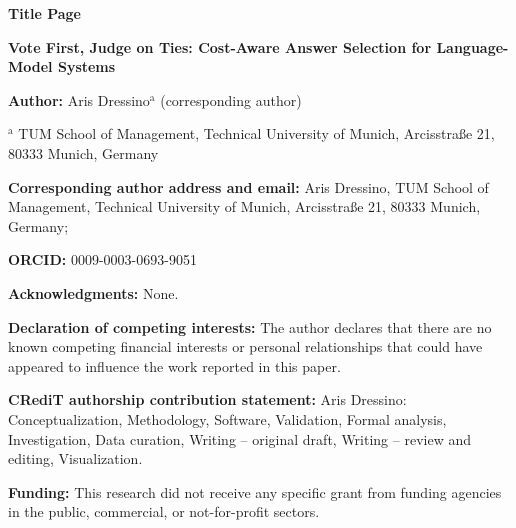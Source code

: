 \documentclass[11pt]{article}
\begin{document}
\begin{center}
{\Large\bfseries Title Page\par}
\vspace{1em}
{\large\bfseries Vote First, Judge on Ties: Cost-Aware Answer Selection for Language-Model Systems\par}
\end{center}

\textbf{Author:} Aris Dressino$^{\mathrm{a}}$ (corresponding author)

$^{\mathrm{a}}$ TUM School of Management, Technical University of Munich, Arcisstra{\ss}e 21, 80333 Munich, Germany

\textbf{Corresponding author address and email:} Aris Dressino, TUM School of Management, Technical University of Munich, Arcisstra{\ss}e 21, 80333 Munich, Germany; \texttt{}

\textbf{ORCID:} 0009-0003-0693-9051

\textbf{Acknowledgments:} None.

\textbf{Declaration of competing interests:} The author declares that there are no known competing financial interests or personal relationships that could have appeared to influence the work reported in this paper.

\textbf{CRediT authorship contribution statement:} Aris Dressino: Conceptualization, Methodology, Software, Validation, Formal analysis, Investigation, Data curation, Writing -- original draft, Writing -- review and editing, Visualization.

\textbf{Funding:} This research did not receive any specific grant from funding agencies in the public, commercial, or not-for-profit sectors.
\end{document}
